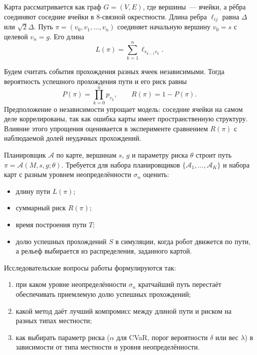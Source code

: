 \documentclass{misisarticle}
\begin{document}
Карта рассматривается как граф $G = (V, E)$, где вершины~--- ячейки, а рёбра соединяют соседние ячейки в 8-связной окрестности. Длина ребра $\ell_{ij}$ равна $\Delta$ или $\sqrt{2}\Delta$. Путь $\pi = (v_0, v_1, \dots, v_n)$ соединяет начальную вершину $v_0 = s$ с целевой $v_n = g$. Его длина
\begin{equation}
  L(\pi) = \sum_{k=1}^{n} \ell_{v_{k-1} v_k}.
  \label{eq:length}
\end{equation}

Будем считать события прохождения разных ячеек независимыми. Тогда вероятность успешного прохождения пути и его риск равны
\begin{equation}
  P(\pi) = \prod_{k=0}^{n} p_{v_k}, \qquad R(\pi) = 1 - P(\pi).
  \label{eq:risk}
\end{equation}
Предположение о независимости упрощает модель: соседние ячейки на самом деле коррелированы, так как ошибка карты имеет пространственную структуру. Влияние этого упрощения оценивается в эксперименте сравнением $R(\pi)$ с наблюдаемой долей неудачных прохождений.

Планировщик $\mathcal{A}$ по карте, вершинам $s$, $g$ и параметру риска $\theta$ строит путь $\pi = \mathcal{A}(M, s, g; \theta)$. Требуется для набора планировщиков $\{\mathcal{A}_1, \dots, \mathcal{A}_K\}$ и набора карт с разным уровнем неопределённости $\sigma_n$ оценить:
\begin{itemize}
  \item длину пути $L(\pi)$;
  \item суммарный риск $R(\pi)$;
  \item время построения пути $T$;
  \item долю успешных прохождений $S$ в симуляции, когда робот движется по пути, а рельеф выбирается из распределения, заданного картой.
\end{itemize}

Исследовательские вопросы работы формулируются так:
\begin{enumerate}[label=\arabic*)]
  \item при каком уровне неопределённости $\sigma_n$ кратчайший путь перестаёт обеспечивать приемлемую долю успешных прохождений;
  \item какой метод даёт лучший компромисс между длиной пути и риском на разных типах местности;
  \item как выбирать параметр риска ($\alpha$ для CVaR, порог вероятности $\delta$ или вес $\lambda$) в зависимости от типа местности и уровня неопределённости.
\end{enumerate}
\end{document}
